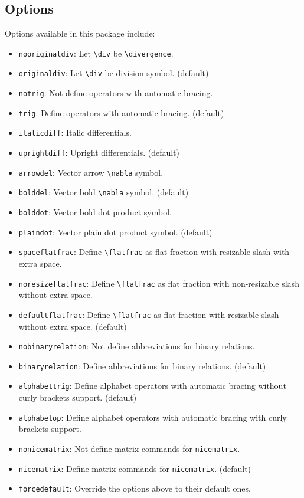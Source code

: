 \documentclass[a4paper,12pt]{article}
\begin{document}
\subsection{Options}
Options available in this package include:
\begin{itemize}
\item \verb|nooriginaldiv|: Let \verb|\div| be \verb|\divergence|.
\item \verb|originaldiv|: Let \verb|\div| be division symbol. (default)
\item \verb|notrig|: Not define operators with automatic bracing.
\item \verb|trig|: Define operators with automatic bracing. (default)
\item \verb|italicdiff|: Italic differentials.
\item \verb|uprightdiff|: Upright differentials. (default)
\item \verb|arrowdel|: Vector arrow \verb|\nabla| symbol.
\item \verb|bolddel|: Vector bold \verb|\nabla| symbol. (default)
\item \verb|bolddot|: Vector bold dot product symbol.
\item \verb|plaindot|: Vector plain dot product symbol. (default)
\item \verb|spaceflatfrac|: Define \verb|\flatfrac| as flat fraction with resizable slash with extra space.
\item \verb|noresizeflatfrac|: Define \verb|\flatfrac| as flat fraction with non-resizable slash without extra space.
\item \verb|defaultflatfrac|: Define \verb|\flatfrac| as flat fraction with resizable slash without extra space. (default)
\item \verb|nobinaryrelation|: Not define abbreviations for binary relations.
\item \verb|binaryrelation|: Define abbreviations for binary relations. (default)
\item \verb|alphabettrig|: Define alphabet operators with automatic bracing without curly brackets support. (default)
\item \verb|alphabetop|: Define alphabet operators with automatic bracing with curly brackets support.
\item \verb|nonicematrix|: Not define matrix commands for \texttt{nicematrix}.
\item \verb|nicematrix|: Define matrix commands for \texttt{nicematrix}. (default)
\item \verb|forcedefault|: Override the options above to their default ones.

\end{itemize}
\end{document}
